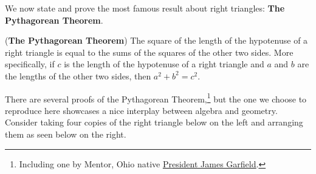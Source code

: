 \documentclass{ximera}
\begin{document}
We now state and prove the most famous result about right triangles:   \textbf{The Pythagorean Theorem}.


\begin{theorem} \label{PythagoreanTheorem} (\textbf{The Pythagorean Theorem}) The square of the length of the hypotenuse of a right triangle is equal to the sums of the squares of the other two sides.  More specifically, if $c$ is the length of the hypotenuse of a right triangle and $a$ and $b$ are the lengths of the other two sides, then $a^2 + b^2 = c^2$.


\end{theorem}



There are several proofs of the Pythagorean Theorem,\footnote{Including one by Mentor, Ohio native \href{http://www.maa.org/press/periodicals/convergence/mathematical-treasure-james-a-garfields-proof-of-the-pythagorean-theorem}{\underline{President James Garfield}}.} but the one we choose to reproduce here showcases a nice interplay between algebra and geometry.  Consider taking four copies of the right triangle below on the left and arranging them as seen below on the right.
\end{document}
